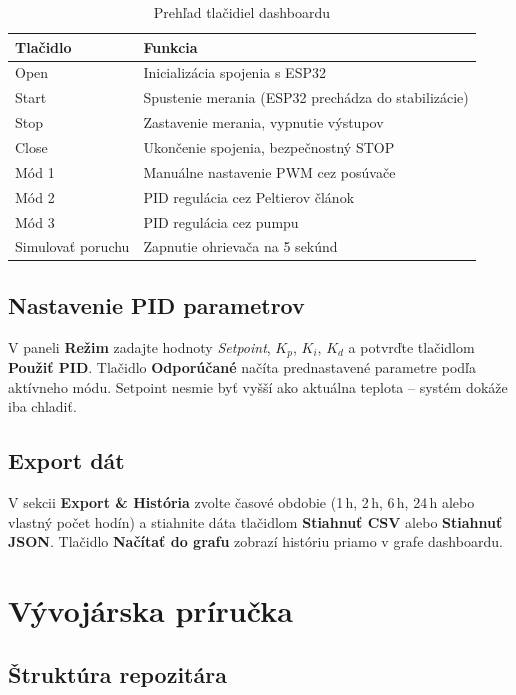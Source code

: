 \begin{table}[H]
\centering
\renewcommand{\arraystretch}{1.3}
\begin{tabular}{|l|l|}
\hline
\textbf{Tlačidlo} & \textbf{Funkcia} \\
\hline
Open     & Inicializácia spojenia s ESP32 \\
Start    & Spustenie merania (ESP32 prechádza do stabilizácie) \\
Stop     & Zastavenie merania, vypnutie výstupov \\
Close    & Ukončenie spojenia, bezpečnostný STOP \\
Mód 1    & Manuálne nastavenie PWM cez posúvače \\
Mód 2    & PID regulácia cez Peltierov článok \\
Mód 3    & PID regulácia cez pumpu \\
Simulovať poruchu & Zapnutie ohrievača na 5 sekúnd \\
\hline
\end{tabular}
\caption{Prehľad tlačidiel dashboardu}
\end{table}

\subsection{Nastavenie PID parametrov}

V paneli \textbf{Režim} zadajte hodnoty \textit{Setpoint}, $K_p$, $K_i$, $K_d$ a potvrďte tlačidlom \textbf{Použiť PID}. Tlačidlo \textbf{Odporúčané} načíta prednastavené parametre podľa aktívneho módu. Setpoint nesmie byť vyšší ako aktuálna teplota -- systém dokáže iba chladiť.

\subsection{Export dát}

V sekcii \textbf{Export \& História} zvolte časové obdobie (1\,h, 2\,h, 6\,h, 24\,h alebo vlastný počet hodín) a stiahnite dáta tlačidlom \textbf{Stiahnuť CSV} alebo \textbf{Stiahnuť JSON}. Tlačidlo \textbf{Načítať do grafu} zobrazí históriu priamo v grafe dashboardu.

\section{Vývojárska príručka}

\subsection{Štruktúra repozitára}

